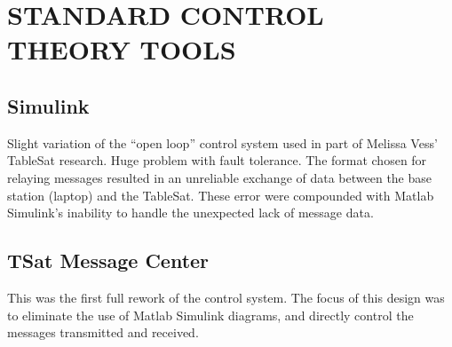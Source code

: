 
\chapter{STANDARD CONTROL THEORY TOOLS}
\label{chap:StandardTools}

\section{Simulink}
\label{sec:Simulink}

Slight variation of the ``open loop'' control system used in part of Melissa Vess' TableSat research.  Huge problem with fault tolerance.  The format chosen for relaying messages resulted in an unreliable exchange of data between the base station (laptop) and the TableSat.  These error were compounded with Matlab Simulink's inability to handle the unexpected lack of message data.



\section{TSat Message Center}
\label{sec:TSatMessageCenter}

This was the first full rework of the control system.  The focus of this design was to eliminate the use of Matlab Simulink diagrams, and directly control the messages transmitted and received.

